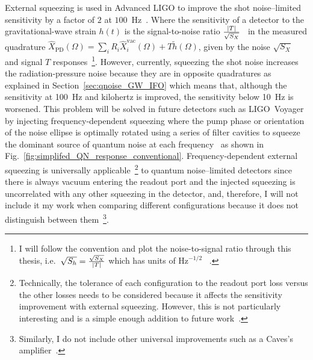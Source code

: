 External squeezing is used in Advanced LIGO to improve the shot noise--limited sensitivity by a factor of $2$ at $100$~Hz~\cite{tseQuantumEnhancedAdvancedLIGO2019}.
Where the sensitivity of a detector to the gravitational-wave strain $h(t)$ is the signal-to-noise ratio $\frac{\abs{T}}{\sqrt{S_X}}$~\cite{} in the measured quadrature $\hat X_\text{PD}(\Omega)=\sum_i R_i \hat X_i^\text{vac}(\Omega) + T \tilde h(\Omega)$, given by the noise $\sqrt{S_X}$ and signal $T$ responses~\footnote{I will follow the convention and plot the noise-to-signal ratio through this thesis, i.e.\ $\sqrt{S_h}=\frac{\sqrt{S_X}}{\abs{T}}$ which has units of $\text{Hz}^{-1/2}$~\cite{} .}. 
However, currently, squeezing the shot noise increases the radiation-pressure noise because they are in opposite quadratures as explained in Section~\ref{sec:qnoise_GW_IFO}  which means that, although the sensitivity at 100~Hz and kilohertz is improved, the sensitivity below 10~Hz  is worsened. This problem will be solved in future detectors such as LIGO~Voyager~\cite{}  by injecting frequency-dependent squeezing where the pump phase or orientation of the noise ellipse is optimally rotated using a series of filter cavities to squeeze the dominant source of quantum noise at each frequency~\cite{} as shown in Fig.~\ref{fig:simplifed_QN_response_conventional}. 
Frequency-dependent external squeezing is universally applicable~\footnote{Technically, the tolerance of each configuration to the readout port loss versus the other losses needs to be considered because it affects the sensitivity improvement with external squeezing. However, this is not particularly interesting and is a simple enough addition to future work~\cite{}.} to quantum noise--limited detectors since there is always vacuum entering the readout port and the injected squeezing is uncorrelated with any other squeezing in the detector, and, therefore, I will not include it my work when comparing different configurations because it does not distinguish between them~\footnote{Similarly, I do not include other universal improvements such as a Caves's amplifier~\cite{}.}.


